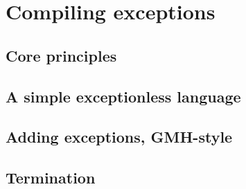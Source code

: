 \chapter{Compiling exceptions}

\section{Core principles}

\section{A simple exceptionless language}

\section{Adding exceptions, GMH-style}

\section{Termination}
